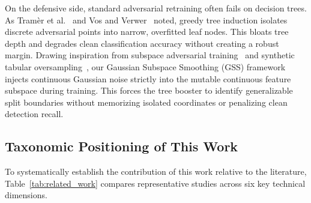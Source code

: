 \documentclass[iicol,pdflatex,sn-mathphys-num]{sn-jnl}
\begin{document}
On the defensive side, standard adversarial retraining often fails on decision trees. As Tram{\`e}r et al.~\cite{tramer2020adaptive} and Vos and Verwer~\cite{vos2024adversarial} noted, greedy tree induction isolates discrete adversarial points into narrow, overfitted leaf nodes. This bloats tree depth and degrades clean classification accuracy without creating a robust margin. Drawing inspiration from subspace adversarial training~\cite{li2021subspace} and synthetic tabular oversampling~\cite{chawla2002smote}, our Gaussian Subspace Smoothing (GSS) framework injects continuous Gaussian noise strictly into the mutable continuous feature subspace during training. This forces the tree booster to identify generalizable split boundaries without memorizing isolated coordinates or penalizing clean detection recall.

\subsection{Taxonomic Positioning of This Work}
\label{sec:rel_taxonomy}
To systematically establish the contribution of this work relative to the literature, Table~\ref{tab:related_work} compares representative studies across six key technical dimensions.
\end{document}
